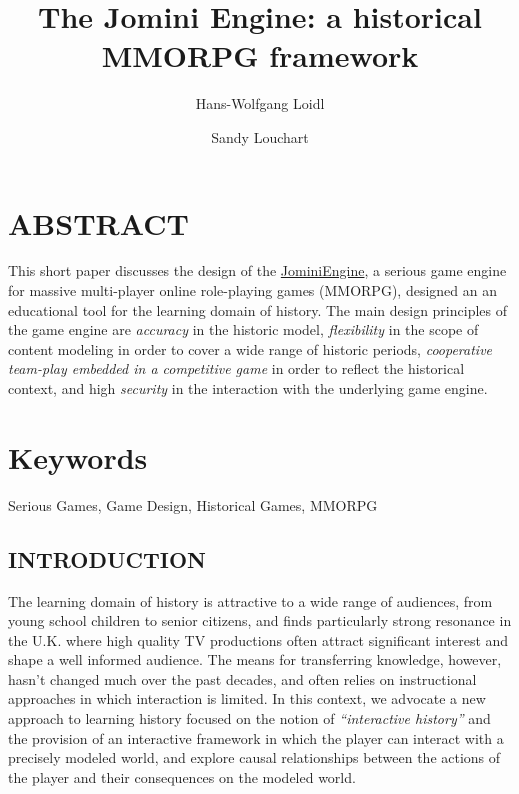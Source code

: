 \documentclass[11pt]{article}
\title{\addvspace{-2\baselineskip}The Jomini Engine: a historical MMORPG framework}
\author{Hans-Wolfgang Loidl}
\affil{
Heriot-Watt University, 
Edinburgh EH144AS, UK \\
\texttt{H.W.Loidl@hw.ac.uk} }
\author{Sandy Louchart}
\affil{
Glasgow School of Arts, 
Glasgow G511EA, UK \\
\texttt{S.Louchart@gsa.ac.uk}}
\date{\vspace{-60pt}}
\begin{document}
\newpage
{}  
   \maketitle
    \copyrightnotice
    
   \section*{ABSTRACT}

   This short paper discusses the design of the \href{http://www.macs.hw.ac.uk/~hwloidl/Projects/JominiEngine/}{JominiEngine}, a serious game engine for
   massive multi-player online role-playing games (MMORPG), designed an an educational
   tool for the learning domain of history.
   The main design principles of the game engine are
   \emph{accuracy} in the historic model,
   \emph{flexibility} in the scope of content modeling in order to cover a wide range of historic periods,
   \emph{cooperative team-play embedded in a competitive game} in order to reflect the  historical context, and
   high \emph{security} in the interaction with the underlying game engine.
   
\section*{Keywords}
Serious Games, Game Design, Historical Games, MMORPG

\subsection*{INTRODUCTION}

The learning domain of history is attractive to a wide range of audiences, from
young school children to senior citizens, and finds particularly strong resonance in the
U.K. where high quality TV productions often attract significant interest and shape a
well informed audience. The means for transferring knowledge, however, hasn't changed
much over the past decades, and often relies on instructional approaches in which interaction
is limited.
In this context, we advocate 
a new approach to learning history %
focused on the notion of
\emph{``interactive history''} and the provision of an interactive framework in which the
player can interact with a precisely modeled world, and explore
causal relationships between the actions of the player and their consequences on the modeled world.
\end{document}

